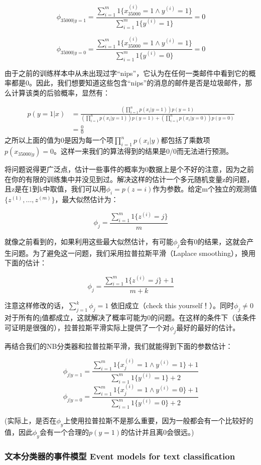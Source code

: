 \documentclass[UTF8]{ctexart}
\begin{document}
\[ \phi_{35000|y=1 } = \frac{\sum_{i=1}^{m}1\{x_{35000}^{(i)}=1 \land y^{(i)}=1 \}}{ \sum_{i=1}^{m} 1 \{ y^{(i)}=1\}} =0 \]

\[  \phi_{35000|y=0 } = \frac{\sum_{i=1}^{m}1\{x_{35000}^{(i)}=1 \land y^{(i)}=1 \}}{ \sum_{i=1}^{m} 1 \{ y^{(i)}=0\}} =0  \]

由于之前的训练样本中从未出现过字“nips”，它认为在任何一类邮件中看到它的概率都是0。因此，我们想要知道这些包含“nips”的消息的邮件是否是垃圾邮件，那么计算该类的后验概率，显然有：

\begin{align*}
p(y=1|x) & = \frac{(\prod_{i=1}^{n}p(x_{i}|y=1))p(y=1)}{(\prod_{i=1}^{n}p(x_{i}|y=1))p(y=1) + (\prod_{i=1}^{n}p(x_{i}|y=0))p(y=0)}\\
& = \frac{0}{0}
\end{align*}
之所以上面的值为0是因为每一个项$\prod_{i=1}^{n}p(x_{i}|y)$都包括了乘数项$p(x_{35000|y})=0$。这样一来我们的算法得到的结果是0/0而无法进行预测。

将问题说得更广泛点，估计一些事件的概率为0数据上是个不好的注意，因为之前在你的有限的训练集中并没见到过。解决这样的估计一个多元随机变量z的问题，且z是在1到k中取值，我们可以用$\phi_{i}=p(z=i)$作为参数。给定m个独立的观测值$\{z^{(1)},..., z^{(m)}\}$，最大似然估计为：

\[\phi_{j} = \frac{\sum_{i=1}^{m}1\{z^{(i)} = j \}}{m}\]

就像之前看到的，如果利用这些最大似然估计，有可能$\phi_{j}$会有0的结果，这就会产生问题。为了避免这一问题，我们采用拉普拉斯平滑（Laplace smoothing），换用下面的估计：

\[ \phi_{j} = \frac{\sum_{i=1}^{m}1\{z^{(i)} = j \}+1}{m+k} \]

注意这样修改的话，$\sum_{j=1}^{k}\phi_{j}=1$ 依旧成立（check this yourself！）。同时$\phi_{j} \neq 0$对于所有的j值都成立，这就解决了概率可能为0的问题。在这样的条件下（该条件可证明是很强的），拉普拉斯平滑实际上提供了一个对$\phi_{j}$最好的最好的估计。

再结合我们的NB分类器和拉普拉斯平滑，我们就能得到下面的参数估计：

\[ \phi_{j|y=1} = \frac{\sum_{i=1}^{m}1\{x_{j}^{(i)}=1 \land y^{(i)}=1 \}+1}{ \sum_{i=1}^{m} 1 \{ y^{(i)}=1\}+2} \]
\[ \phi_{j|y=0} = \frac{\sum_{i=1}^{m}1\{x_{j}^{(i)}=1 \land y^{(i)}=0 \}+1}{ \sum_{i=1}^{m} 1 \{ y^{(i)}=0\}+2} \]

(实际上，是否在$\phi_{y}$上使用拉普拉斯不是那么重要，因为一般都会有一个比较好的值，因此$\phi_{y}$会有一个合理的$p(y=1)$的估计并且离0会很远。)


\subsubsection{文本分类器的事件模型 Event models for text classification}
\end{document}
